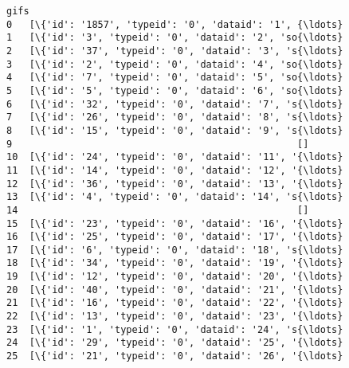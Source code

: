 \documentclass[11pt]{article}
\begin{document}
\begin{tcolorbox}[breakable, size=fbox, boxrule=.5pt, pad at break*=1mm, opacityfill=0]
\begin{Verbatim}[commandchars=\\\{\}]
                                                 gifs
0   [\{'id': '1857', 'typeid': '0', 'dataid': '1', {\ldots}
1   [\{'id': '3', 'typeid': '0', 'dataid': '2', 'so{\ldots}
2   [\{'id': '37', 'typeid': '0', 'dataid': '3', 's{\ldots}
3   [\{'id': '2', 'typeid': '0', 'dataid': '4', 'so{\ldots}
4   [\{'id': '7', 'typeid': '0', 'dataid': '5', 'so{\ldots}
5   [\{'id': '5', 'typeid': '0', 'dataid': '6', 'so{\ldots}
6   [\{'id': '32', 'typeid': '0', 'dataid': '7', 's{\ldots}
7   [\{'id': '26', 'typeid': '0', 'dataid': '8', 's{\ldots}
8   [\{'id': '15', 'typeid': '0', 'dataid': '9', 's{\ldots}
9                                                  []
10  [\{'id': '24', 'typeid': '0', 'dataid': '11', '{\ldots}
11  [\{'id': '14', 'typeid': '0', 'dataid': '12', '{\ldots}
12  [\{'id': '36', 'typeid': '0', 'dataid': '13', '{\ldots}
13  [\{'id': '4', 'typeid': '0', 'dataid': '14', 's{\ldots}
14                                                 []
15  [\{'id': '23', 'typeid': '0', 'dataid': '16', '{\ldots}
16  [\{'id': '25', 'typeid': '0', 'dataid': '17', '{\ldots}
17  [\{'id': '6', 'typeid': '0', 'dataid': '18', 's{\ldots}
18  [\{'id': '34', 'typeid': '0', 'dataid': '19', '{\ldots}
19  [\{'id': '12', 'typeid': '0', 'dataid': '20', '{\ldots}
20  [\{'id': '40', 'typeid': '0', 'dataid': '21', '{\ldots}
21  [\{'id': '16', 'typeid': '0', 'dataid': '22', '{\ldots}
22  [\{'id': '13', 'typeid': '0', 'dataid': '23', '{\ldots}
23  [\{'id': '1', 'typeid': '0', 'dataid': '24', 's{\ldots}
24  [\{'id': '29', 'typeid': '0', 'dataid': '25', '{\ldots}
25  [\{'id': '21', 'typeid': '0', 'dataid': '26', '{\ldots}
\end{Verbatim}
\end{tcolorbox}
        
\end{document}
